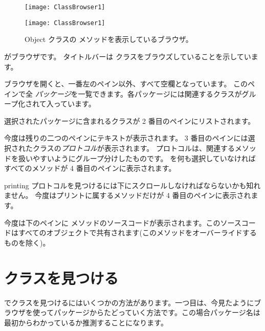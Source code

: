 \documentclass[a4paper,10pt,twoside]{book}
\begin{document}
\begin{figure}[htb]
\ifluluelse
	{\centerline {\texttt{[image: ClassBrowser1]}}}
	{\centerline {\texttt{[image: ClassBrowser1]}}}
\caption{Object クラスの  メソッドを表示しているブラウザ。
}
\end{figure}

 がブラウザです。
タイトルバーは  クラスをブラウズしていることを示しています。

ブラウザを開くと、一番左のペイン以外、すべて空欄となっています。
このペインで全 \emph{パッケージ}を一覧できます。各パッケージには関連するクラスがグループ化されて入っています。

選択されたパッケージに含まれるクラスが 2 番目のペインにリストされます。


今度は残りの二つのペインにテキストが表示されます。
3 番目のペインには選択されたクラスの\emph{プロトコル}が表示されます。
プロトコルは、関連するメソッドを扱いやすいようにグループ分けしたものです。
を何も選択していなければすべてのメソッドが 4 番目のペインに表示されます。

printing プロトコルを見つけるには下にスクロールしなければならないかも知れません。
今度はプリントに属するメソッドだけが 4 番目のペインに表示されます。

今度は下のペインに  メソッドのソースコードが表示されます。このソースコードはすべてのオブジェクトで共有されます(このメソッドをオーバーライドするものを除く)。

\section{クラスを見つける}

\pharo でクラスを見つけるにはいくつかの方法があります。一つ目は、今見たようにブラウザを使ってパッケージからたどっていく方法です。この場合パッケージ名は最初からわかっているか推測することになります。
\end{document}
